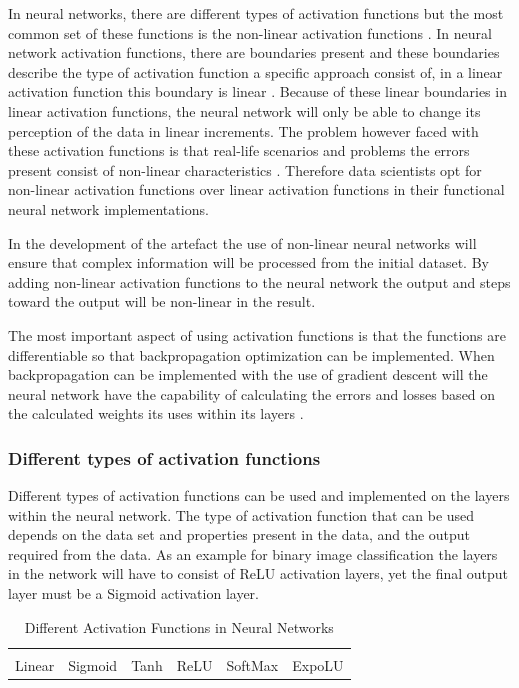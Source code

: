 In neural networks, there are different types of activation functions but the most common set of these functions is the non-linear activation functions \citep{sharma2017}. In neural network activation functions, there are boundaries present and these boundaries describe the type of activation function a specific approach consist of, in a linear activation function this boundary is linear \citep{sharma2017}. Because of these linear boundaries in linear activation functions, the neural network will only be able to change its perception of the data in linear increments. The problem however faced with these activation functions is that real-life scenarios and problems the errors present consist of non-linear characteristics \citep{sharma2017}. Therefore data scientists opt for non-linear activation functions over linear activation functions in their functional neural network implementations.

In the development of the artefact the use of non-linear neural networks will ensure that complex information will be processed from the initial dataset. By adding non-linear activation functions to the neural network the output and steps toward the output will be non-linear in the result. 

The most important aspect of using activation functions is that the functions are differentiable so that backpropagation optimization can be implemented. When backpropagation can be implemented with the use of gradient descent will the neural network have the capability of calculating the errors and losses based on the calculated weights its uses within its layers \citep{sharma2017}.

\subsubsection{Different types of activation functions}

Different types of activation functions can be used and implemented on the layers within the neural network. The type of activation function that can be used depends on the data set and properties present in the data, and the output required from the data. As an example for binary image classification the layers in the network will have to consist of ReLU activation layers, yet the final output layer must be a Sigmoid activation layer.

\begin{table}[H]%
\caption{Different Activation Functions in Neural Networks \citep{sharma2017}}
\label{tabl:actfnn}
\centering
\small
\begin{tabular}{cccccc}
\hline
\\ Linear & Sigmoid & Tanh & ReLU & SoftMax & ExpoLU \\
\hline
\end{tabular}
\end{table}

